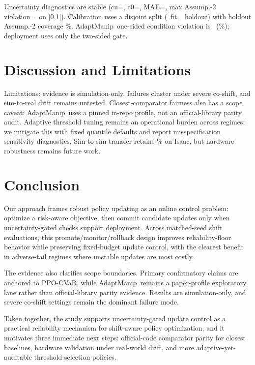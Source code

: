 \documentclass[letterpaper,10pt,conference]{ieeeconf}
\newcommand{\CoreRefTwoLabel}{PPO-CVaR}
\newcommand{\CoreCompAdaptManip}{AdaptManip}
\begin{document}
Uncertainty diagnostics are stable (cu=\CoreUncertaintyCu, c0=\CoreUncertaintyCzero, MAE=\CoreUncertaintyHoldoutMae, max Assump.-2 violation=\CoreUncertaintyMaxViolation\ on [0,1]). Calibration uses a disjoint split (\CoreUncertaintyTrainRows\ fit, \CoreUncertaintyHoldoutRows\ holdout) with holdout Assump.-2 coverage \CoreUncertaintyCoveragePct\%. \CoreCompAdaptManip\ one-sided condition violation is \CoreUncertaintyViolationRate\ (\CoreUncertaintyViolationRatePct\%); deployment uses only the two-sided gate.

\section{Discussion and Limitations}

Limitations: evidence is simulation-only, failures cluster under severe co-shift, and sim-to-real drift remains untested. Closest-comparator fairness also has a scope caveat: \CoreCompAdaptManip\ uses a pinned in-repo profile, not an official-library parity audit. Adaptive threshold tuning remains an operational burden across regimes; we mitigate this with fixed quantile defaults and report misspecification sensitivity diagnostics. Sim-to-sim transfer retains \CoreSimIsaacMethodRetentionPct\% on Isaac, but hardware robustness remains future work.

\section{Conclusion}
Our approach frames robust policy updating as an online control problem: optimize a risk-aware objective, then commit candidate updates only when uncertainty-gated checks support deployment. Across matched-seed shift evaluations, this promote/monitor/rollback design improves reliability-floor behavior while preserving fixed-budget update control, with the clearest benefit in adverse-tail regimes where unstable updates are most costly.

The evidence also clarifies scope boundaries. Primary confirmatory claims are anchored to \CoreRefTwoLabel, while \CoreCompAdaptManip\ remains a paper-profile exploratory lane rather than official-library parity evidence. Results are simulation-only, and severe co-shift settings remain the dominant failure mode.

Taken together, the study supports uncertainty-gated update control as a practical reliability mechanism for shift-aware policy optimization, and it motivates three immediate next steps: official-code comparator parity for closest baselines, hardware validation under real-world drift, and more adaptive-yet-auditable threshold selection policies.



\end{document}
